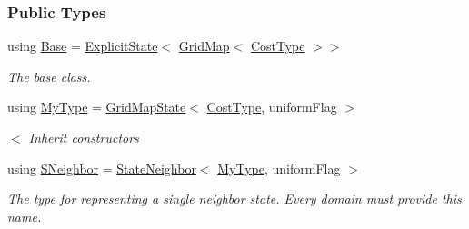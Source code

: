 \subsubsection*{Public Types}
\begin{DoxyCompactItemize}
\item 
using \hyperlink{structgridMap_1_1GridMapState_ae7020192b3e6ea72d9d6101ba17bfa62}{Base} = \hyperlink{structExplicitState}{Explicit\+State}$<$ \hyperlink{structGridMap}{Grid\+Map}$<$ \hyperlink{structExplicitState_aa49e13944e1f40aaeb4ed7190234b21e}{Cost\+Type} $>$$>$\hypertarget{structgridMap_1_1GridMapState_ae7020192b3e6ea72d9d6101ba17bfa62}{}\label{structgridMap_1_1GridMapState_ae7020192b3e6ea72d9d6101ba17bfa62}

\begin{DoxyCompactList}\small\item\em The base class. \end{DoxyCompactList}\item 
using \hyperlink{structgridMap_1_1GridMapState_a70aeaf4e8c61a642520a4aeda234ef71}{My\+Type} = \hyperlink{structgridMap_1_1GridMapState}{Grid\+Map\+State}$<$ \hyperlink{structExplicitState_aa49e13944e1f40aaeb4ed7190234b21e}{Cost\+Type}, uniform\+Flag $>$
\begin{DoxyCompactList}\small\item\em $<$ Inherit constructors \end{DoxyCompactList}\item 
using \hyperlink{structgridMap_1_1GridMapState_ae3f997c80d854a2fa6eae8f949263211}{S\+Neighbor} = \hyperlink{structStateNeighbor}{State\+Neighbor}$<$ \hyperlink{structgridMap_1_1GridMapState_a70aeaf4e8c61a642520a4aeda234ef71}{My\+Type}, uniform\+Flag $>$\hypertarget{structgridMap_1_1GridMapState_ae3f997c80d854a2fa6eae8f949263211}{}\label{structgridMap_1_1GridMapState_ae3f997c80d854a2fa6eae8f949263211}

\begin{DoxyCompactList}\small\item\em The type for representing a single neighbor state. Every domain must provide this name. \end{DoxyCompactList}\end{DoxyCompactItemize}
